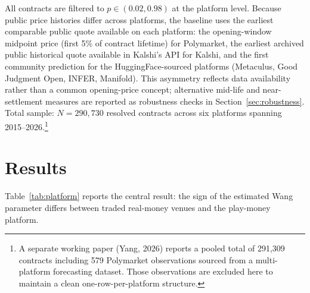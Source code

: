 \documentclass[12pt]{article}
\begin{document}
All contracts are filtered to $p \in (0.02, 0.98)$ at the platform level. Because public price histories differ across platforms, the baseline uses the earliest comparable public quote available on each platform: the opening-window midpoint price (first 5\% of contract lifetime) for Polymarket, the earliest archived public historical quote available in Kalshi's API for Kalshi, and the first community prediction for the HuggingFace-sourced platforms (Metaculus, Good Judgment Open, INFER, Manifold). This asymmetry reflects data availability rather than a common opening-price concept; alternative mid-life and near-settlement measures are reported as robustness checks in Section~\ref{sec:robustness}. Total sample: $N = 290{,}730$ resolved contracts across six platforms spanning 2015--2026.\footnote{A separate working paper (Yang, 2026) reports a pooled total of 291,309 contracts including 579 Polymarket observations sourced from a multi-platform forecasting dataset. Those observations are excluded here to maintain a clean one-row-per-platform structure.}

\section{Results}

Table~\ref{tab:platform} reports the central result: the sign of the estimated Wang parameter differs between traded real-money venues and the play-money platform.
\end{document}
